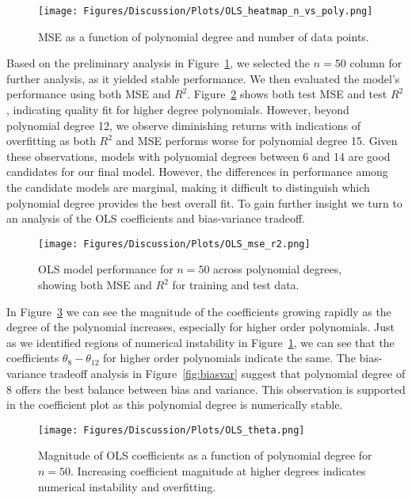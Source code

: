 \documentclass[amssymb,twocolumn,aps]{revtex4}
\begin{document}
\begin{figure}[h]
    \centering
    \texttt{[image: Figures/Discussion/Plots/OLS\_heatmap\_n\_vs\_poly.png]}
    \caption{MSE as a function of polynomial degree and number of data points.}
    \label{fig:OLS_n_poly}
\end{figure}

Based on the preliminary analysis in Figure~\ref{fig:OLS_n_poly}, we selected the $n=50$ column for further analysis, as it yielded stable performance. We then evaluated the model's performance using both MSE and $R^2$. Figure~\ref{fig:OLS_MSE} shows both test MSE and test $R^2$, indicating quality fit for higher degree polynomials. However, beyond polynomial degree 12, we observe diminishing returns with indications of overfitting as both $R^2$ and MSE performs worse for polynomial degree 15. Given these observations, models with polynomial degrees between 6 and 14 are good candidates for our final model. However, the differences in performance among the candidate models are marginal, making it difficult to distinguish which polynomial degree provides the best overall fit. To gain further insight we turn to an analysis of the OLS coefficients and bias-variance tradeoff.
\begin{figure}[h]
    \centering
    \texttt{[image: Figures/Discussion/Plots/OLS\_mse\_r2.png]}
    \caption{OLS model performance for $n=50$ across polynomial degrees, showing both MSE and $R^2$ for training and test data.}
    \label{fig:OLS_MSE}
\end{figure}

In Figure~\ref{fig:coef} we can see the magnitude of the coefficients growing rapidly as the degree of the polynomial increases, especially for higher order polynomials. Just as we identified regions of numerical instability in Figure~\ref{fig:OLS_n_poly}, we can see that the coefficients $\theta_8 -\theta_{12}$ for higher order polynomials indicate the same. The bias-variance tradeoff analysis in Figure~\ref{fig:biasvar} suggest that polynomial degree of 8 offers the best balance between bias and variance. This observation is supported in the coefficient plot as this polynomial degree is numerically stable.

\begin{figure}[h]
    \centering
    \texttt{[image: Figures/Discussion/Plots/OLS\_theta.png]}
    \caption{Magnitude of OLS coefficients as a function of polynomial degree for $n=50$. Increasing coefficient magnitude at higher degrees indicates numerical instability and overfitting.}
    \label{fig:coef}
\end{figure}
\end{document}
